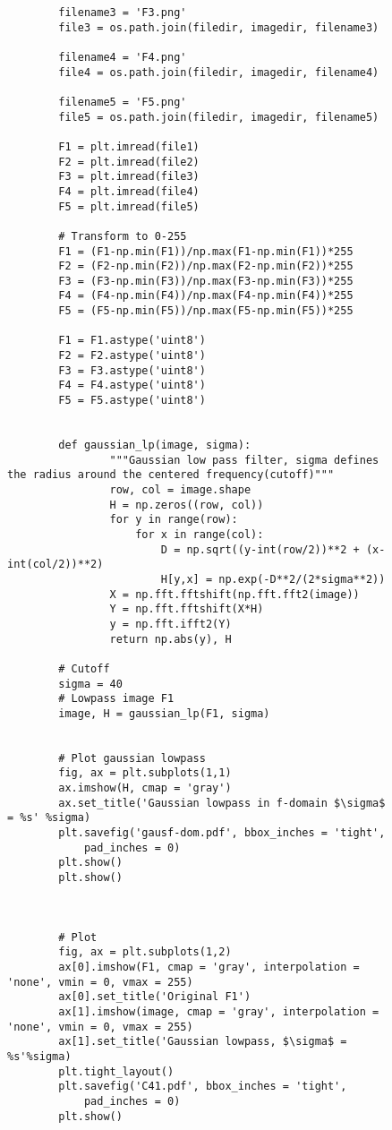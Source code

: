 {\begin{figure}[hbt!]
\begin{lstlisting}
        filename3 = 'F3.png'
        file3 = os.path.join(filedir, imagedir, filename3)
        
        filename4 = 'F4.png'
        file4 = os.path.join(filedir, imagedir, filename4)
        
        filename5 = 'F5.png'
        file5 = os.path.join(filedir, imagedir, filename5)
        
        F1 = plt.imread(file1)
        F2 = plt.imread(file2)
        F3 = plt.imread(file3)
        F4 = plt.imread(file4)
        F5 = plt.imread(file5)
        
        # Transform to 0-255
        F1 = (F1-np.min(F1))/np.max(F1-np.min(F1))*255
        F2 = (F2-np.min(F2))/np.max(F2-np.min(F2))*255
        F3 = (F3-np.min(F3))/np.max(F3-np.min(F3))*255
        F4 = (F4-np.min(F4))/np.max(F4-np.min(F4))*255
        F5 = (F5-np.min(F5))/np.max(F5-np.min(F5))*255
        
        F1 = F1.astype('uint8')
        F2 = F2.astype('uint8')
        F3 = F3.astype('uint8')
        F4 = F4.astype('uint8')
        F5 = F5.astype('uint8')
        
        
        def gaussian_lp(image, sigma):
                """Gaussian low pass filter, sigma defines the radius around the centered frequency(cutoff)"""
                row, col = image.shape
                H = np.zeros((row, col))
                for y in range(row):
                    for x in range(col):
                        D = np.sqrt((y-int(row/2))**2 + (x-int(col/2))**2)
                        H[y,x] = np.exp(-D**2/(2*sigma**2))
                X = np.fft.fftshift(np.fft.fft2(image))
                Y = np.fft.fftshift(X*H)
                y = np.fft.ifft2(Y)
                return np.abs(y), H
        
        # Cutoff
        sigma = 40
        # Lowpass image F1
        image, H = gaussian_lp(F1, sigma)
        
        
        # Plot gaussian lowpass
        fig, ax = plt.subplots(1,1)
        ax.imshow(H, cmap = 'gray')
        ax.set_title('Gaussian lowpass in f-domain $\sigma$ = %s' %sigma)
        plt.savefig('gausf-dom.pdf', bbox_inches = 'tight',
            pad_inches = 0)
        plt.show()
        plt.show()
        
        
        
        # Plot
        fig, ax = plt.subplots(1,2)
        ax[0].imshow(F1, cmap = 'gray', interpolation = 'none', vmin = 0, vmax = 255)
        ax[0].set_title('Original F1')
        ax[1].imshow(image, cmap = 'gray', interpolation = 'none', vmin = 0, vmax = 255)
        ax[1].set_title('Gaussian lowpass, $\sigma$ = %s'%sigma)
        plt.tight_layout()
        plt.savefig('C41.pdf', bbox_inches = 'tight',
            pad_inches = 0)
        plt.show()
        

\end{lstlisting}
\end{figure}}
